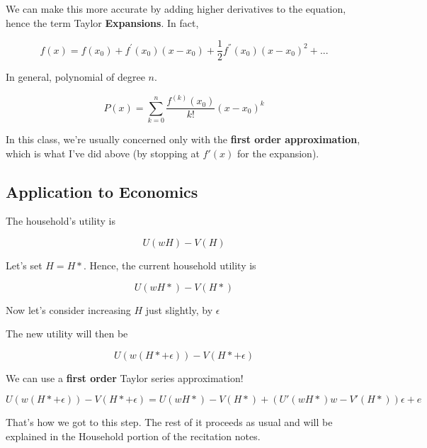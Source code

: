 \documentclass[11pt]{scrartcl}
\begin{document}
We can make this more accurate by adding higher derivatives to the equation, hence the term Taylor \textbf{Expansions}. In fact,

\[ f(x)=f(x_{0})+f^{'}(x_{0})(x-x_{0})+\frac{1}{2}f^{''}(x_{0})(x-x_{0})^{2}+... \]

In general, polynomial of degree $n$.

\[P(x)=\sum_{k=0}^n \frac{f^{(k)}(x_{0})}{k!} (x-x_0)^k \]

In this class, we're usually concerned only with the \textbf{first order approximation}, which is what I've did above (by stopping at $f'(x)$ for the expansion).

\subsection{Application to Economics}

The household's utility is

\[U(wH) - V(H)\]

Let's set $H = H*$. Hence, the current household utility is

\[U(wH*) - V(H*)\]

Now let's consider increasing $H$ just slightly, by $\epsilon$

The new utility will then be

\[U(w(H*+\epsilon)) - V(H*+\epsilon) \]

We can use a \textbf{first order} Taylor series approximation!

\[ U(w(H*+\epsilon)) - V(H*+\epsilon) = U(wH*) - V(H*) + (U' (wH*)w - V'(H*))\epsilon + e\]

That's how we got to this step. The rest of it proceeds as usual and will be explained in the Household portion of the recitation notes.
\end{document}

